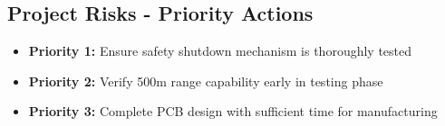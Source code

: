 \subsection*{Project Risks - Priority Actions}
\begin{itemize}
    \item \textbf{Priority 1:} Ensure safety shutdown mechanism is thoroughly tested
    \item \textbf{Priority 2:} Verify 500m range capability early in testing phase
    \item \textbf{Priority 3:} Complete PCB design with sufficient time for manufacturing
\end{itemize}
